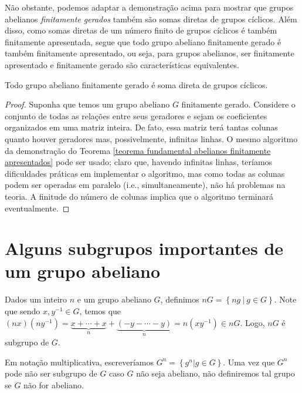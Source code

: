     	\par\vspace{0.3cm} Não obstante, podemos adaptar a demonstração acima para mostrar que grupos 
    	abelianos \textit{finitamente gerados} também são somas diretas de grupos cíclicos. Além disso, 
    	como somas diretas de um número finito de grupos cíclicos é também finitamente apresentada, segue 
    	que todo grupo abeliano finitamente gerado é também finitamente apresentado, ou seja, para grupos
    	abelianos, ser finitamente apresentado e finitamente gerado são características equivalentes.
    	\begin{theorem}
    	\label{teorema fundamental abelianos finitamente gerados}
    		Todo grupo abeliano finitamente gerado é soma direta de grupos cíclicos.
    	\end{theorem}
    	\begin{proof}
    		Suponha que temos um grupo abeliano $G$ finitamente gerado. Considere o conjunto de todas 
    		as relações entre seus geradores e sejam os coeficientes organizados em uma matriz inteira. 
    		De fato, essa matriz terá tantas colunas quanto houver geradores mas, possivelmente, infinitas 
    		linhas. O mesmo algoritmo da demonstração do 
    		Teorema \ref{teorema fundamental abelianos finitamente apresentados} pode ser usado; claro que,
    		havendo infinitas linhas, teríamos dificuldades práticas em implementar o algoritmo, mas como 
    		todas as colunas podem ser operadas em paralelo (i.e., simultaneamente), não há problemas na teoria.
    		A finitude do número de colunas implica que o algoritmo terminará eventualmente.
    	\end{proof}
	\section{Alguns subgrupos importantes de um grupo abeliano}
    	Dados um inteiro $n$ e um grupo abeliano $G$, definimos $nG = \left\{ ng \ \vert \ g\in G \right\}$. 
    	Note que sendo $x,y^{-1}\in G$, temos que 
    	$(nx)(ny^{-1}) = \underbrace{x+\cdots+x}_{n} + \underbrace{(-y-\cdots-y)}_{n} = n(xy^{-1})\in nG$. 
    	Logo, $nG$ é subgrupo de $G$. 
    	
    	\par\vspace{0.3cm} Em notação multiplicativa, escreveríamos $G^n = \left\{ g^n\vert g\in G \right\}$. 
    	Uma vez que $G^n$ pode não ser subgrupo de $G$ caso $G$ não seja abeliano, não definiremos tal grupo 
    	se $G$ não for abeliano.
    	
